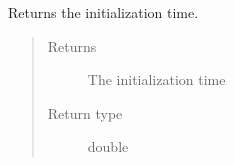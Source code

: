 \documentclass[letterpaper,10pt,english]{sphinxmanual}
\begin{document}

\begin{fulllineitems}
\label{doc:gedlibpy.get_init_time}
Returns the initialization time.
\begin{quote}\begin{description}
\item[{Returns}] \leavevmode
The initialization time

\item[{Return type}] \leavevmode
double

\end{description}\end{quote}

\end{fulllineitems}

\end{document}

